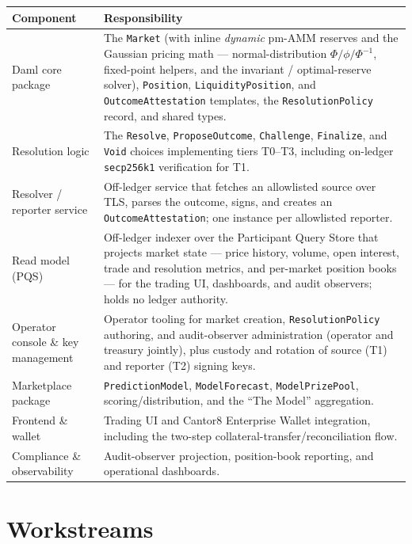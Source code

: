 \documentclass[11pt,a4paper]{article}
\begin{document}
\vspace{0.2em}
\begin{center}
\renewcommand{\arraystretch}{1.15}
\begin{tabularx}{\linewidth}{R{3.4cm} Y}
\toprule
\textbf{Component} & \textbf{Responsibility} \\
\midrule
Daml core package & The \texttt{Market} (with inline \emph{dynamic} pm-AMM reserves and the Gaussian pricing math --- normal-distribution $\Phi/\phi/\Phi^{-1}$, fixed-point helpers, and the invariant / optimal-reserve solver), \texttt{Position}, \texttt{LiquidityPosition}, and \texttt{OutcomeAttestation} templates, the \texttt{ResolutionPolicy} record, and shared types. \\
Resolution logic & The \texttt{Resolve}, \texttt{ProposeOutcome}, \texttt{Challenge}, \texttt{Finalize}, and \texttt{Void} choices implementing tiers T0--T3, including on-ledger \texttt{secp256k1} verification for T1. \\
Resolver / reporter service & Off-ledger service that fetches an allowlisted source over TLS, parses the outcome, signs, and creates an \texttt{OutcomeAttestation}; one instance per allowlisted reporter. \\
Read model (PQS) & Off-ledger indexer over the Participant Query Store that projects market state --- price history, volume, open interest, trade and resolution metrics, and per-market position books --- for the trading UI, dashboards, and audit observers; holds no ledger authority. \\
Operator console \& key management & Operator tooling for market creation, \texttt{ResolutionPolicy} authoring, and audit-observer administration (operator and treasury jointly), plus custody and rotation of source (T1) and reporter (T2) signing keys. \\
Marketplace package & \texttt{PredictionModel}, \texttt{ModelForecast}, \texttt{ModelPrizePool}, scoring/distribution, and the ``The Model'' aggregation. \\
Frontend \& wallet & Trading UI and Cantor8 Enterprise Wallet integration, including the two-step collateral-transfer/reconciliation flow. \\
Compliance \& observability & Audit-observer projection, position-book reporting, and operational dashboards. \\
\bottomrule
\end{tabularx}
\end{center}

\section{Workstreams}
\end{document}
